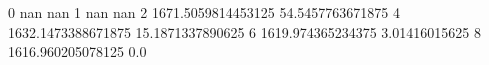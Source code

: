 0 nan nan
1 nan nan
2 1671.5059814453125 54.5457763671875
4 1632.1473388671875 15.1871337890625
6 1619.974365234375 3.01416015625
8 1616.960205078125 0.0
